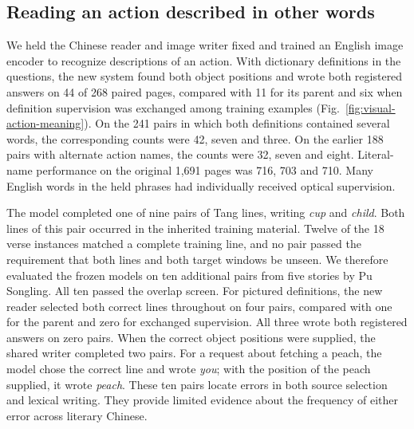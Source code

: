 \subsection*{Reading an action described in other words}
We held the Chinese reader and image writer fixed and trained an English image encoder to recognize descriptions of an action. With dictionary definitions in the questions, the new system found both object positions and wrote both registered answers on 44 of 268 paired pages, compared with 11 for its parent and six when definition supervision was exchanged among training examples (Fig.~\ref{fig:visual-action-meaning}). On the 241 pairs in which both definitions contained several words, the corresponding counts were 42, seven and three. On the earlier 188 pairs with alternate action names, the counts were 32, seven and eight. Literal-name performance on the original 1,691 pages was 716, 703 and 710. Many English words in the held phrases had individually received optical supervision.

The model completed one of nine pairs of Tang lines, writing \textit{cup} and \textit{child}. Both lines of this pair occurred in the inherited training material. Twelve of the 18 verse instances matched a complete training line, and no pair passed the requirement that both lines and both target windows be unseen. We therefore evaluated the frozen models on ten additional pairs from five stories by Pu Songling. All ten passed the overlap screen. For pictured definitions, the new reader selected both correct lines throughout on four pairs, compared with one for the parent and zero for exchanged supervision. All three wrote both registered answers on zero pairs. When the correct object positions were supplied, the shared writer completed two pairs. For a request about fetching a peach, the model chose the correct line and wrote \textit{you}; with the position of the peach supplied, it wrote \textit{peach}. These ten pairs locate errors in both source selection and lexical writing. They provide limited evidence about the frequency of either error across literary Chinese.

